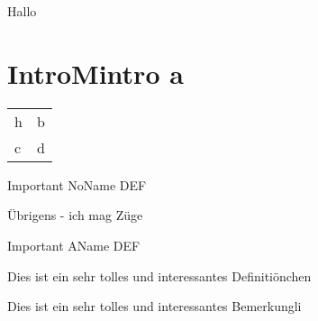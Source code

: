 \documentclass[Typ=Mitschrieb,Vorlesung=LAII]{Lilly}
\begin{document}
    Hallo \cite{Beispiel}



    \section{IntroMintro a}
        \begin{tabularx}{\linewidth}{lX}
            h & b \\
            c & d
        \end{tabularx}

        \begin{definition*}
            Important NoName DEF
        \end{definition*}

        \begin{satz}[Übrigens]
            Übrigens - ich mag Züge
        \end{satz}

        \begin{definition*}[Important]
            Important AName DEF
        \end{definition*}

        \begin{definition}
            Dies ist ein sehr tolles und interessantes Definitiönchen
        \end{definition}
        \begin{bemerkung}
            Dies ist ein sehr tolles und interessantes Bemerkungli
        \end{bemerkung}

\end{document}
